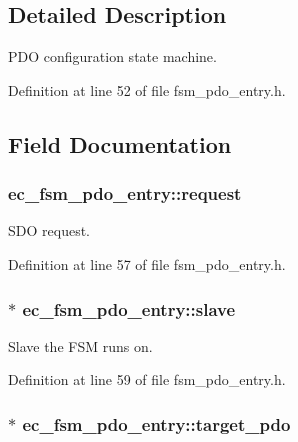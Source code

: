 \subsection{Detailed Description}
P\-D\-O configuration state machine. 

Definition at line 52 of file fsm\-\_\-pdo\-\_\-entry.\-h.



\subsection{Field Documentation}
\subsubsection[{request}]{ ec\-\_\-fsm\-\_\-pdo\-\_\-entry\-::request}\label{structec__fsm__pdo__entry_ac0b43d5b10545d11bdb643455a3e8847}


S\-D\-O request. 



Definition at line 57 of file fsm\-\_\-pdo\-\_\-entry.\-h.

\subsubsection[{slave}]{$\ast$ ec\-\_\-fsm\-\_\-pdo\-\_\-entry\-::slave}\label{structec__fsm__pdo__entry_a21123d79b0c9c5cde2c646a23c2ebbf6}


Slave the F\-S\-M runs on. 



Definition at line 59 of file fsm\-\_\-pdo\-\_\-entry.\-h.

\subsubsection[{target\-\_\-pdo}]{$\ast$ ec\-\_\-fsm\-\_\-pdo\-\_\-entry\-::target\-\_\-pdo}\label{structec__fsm__pdo__entry_a3692d0c265514bf9d0723715786d2ca6}


